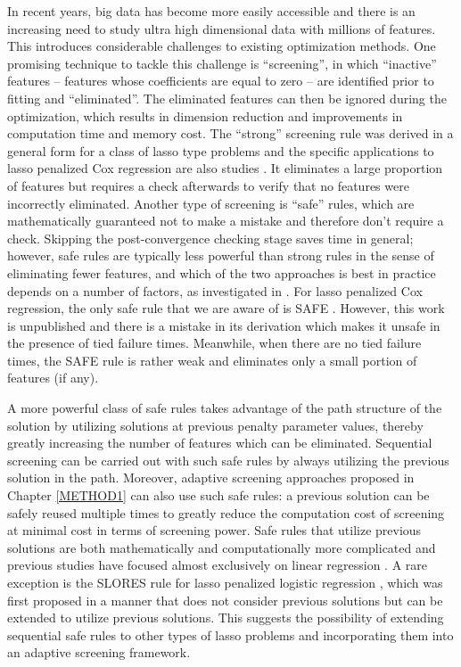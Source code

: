 In recent years, big data has become more easily accessible and there is an increasing need to study ultra high dimensional data with millions of features. This introduces considerable challenges to existing optimization methods. One promising technique to tackle this challenge is ``screening'', in which ``inactive'' features -- features whose coefficients are equal to zero -- are identified prior to fitting and ``eliminated''. The eliminated features can then be ignored during the optimization, which results in dimension reduction and improvements in computation time and memory cost. The ``strong'' screening rule \citep{Tibshirani2012} was derived in a general form for a class of lasso type problems and the specific applications to lasso penalized Cox regression are also studies \citep{simon2011regularization,yang2013}. It eliminates a large proportion of features but requires a check afterwards to verify that no features were incorrectly eliminated. Another type of screening is ``safe'' rules, which are mathematically guaranteed not to make a mistake and therefore don't require a check. Skipping the post-convergence checking stage saves time in general; however, safe rules are typically less powerful than strong rules in the sense of eliminating fewer features, and which of the two approaches is best in practice depends on a number of factors, as investigated in \citep{Zeng2021}. For lasso penalized Cox regression, the only safe rule that we are aware of is SAFE \citep{ko2017solving}. However, this work is unpublished and there is a mistake in its derivation which makes it unsafe in the presence of tied failure times. Meanwhile, when there are no tied failure times, the SAFE rule is rather weak and eliminates only a small portion of features (if any).

A more powerful class of safe rules takes advantage of the path structure of the solution by utilizing solutions at previous penalty parameter values, thereby greatly increasing the number of features which can be eliminated. Sequential screening can be carried out with such safe rules by always utilizing the previous solution in the path. Moreover, adaptive screening approaches proposed in Chapter \ref{METHOD1} can also use such safe rules: a previous solution can be safely reused multiple times to greatly reduce the computation cost of screening at minimal cost in terms of screening power. Safe rules that utilize previous solutions are both mathematically and computationally more complicated and previous studies have focused almost exclusively on linear regression \citep{wang2013lasso}. A rare exception is the SLORES rule for lasso penalized logistic regression \citep{wang2014safe}, which was first proposed in a manner that does not consider previous solutions but can be extended to utilize previous solutions. This suggests the possibility of extending sequential safe rules to other types of lasso problems and incorporating them into an adaptive screening framework.


